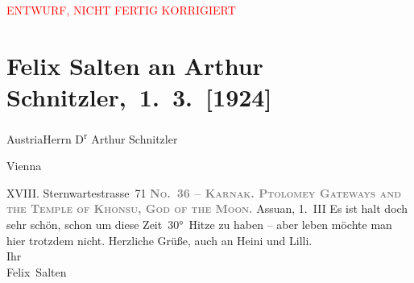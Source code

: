 
\begin{center}
            \textcolor{red}{ENTWURF, NICHT FERTIG KORRIGIERT}
                      \end{center}
            
         
         \renewcommand{\erwaehntePersonen}{Personen: Felix Salten, Heinrich Schnitzler, Lilly Schnitzler}
         \renewcommand{\erwaehnteOrte}{Orte: Assuan, Karnak Tempelanlage, Old Cataract Hotel, Sternwartestraße 71, Wien, Österreich}
         \renewcommand{\erwaehnteWerke}{}
               \section[ Felix Salten an Arthur Schnitzler, 1. 3. {[}1924{]}]{ Felix Salten an Arthur Schnitzler, 1. 3. {[}1924{]}}\nopagebreak{}\rehead{ }\begin{ledgroupsized}[t]{13cm}\normalsize\beginnumbering \toendnotes[C]{\smallbreak\pagebreak[2]} 
\pstart{}{\pb}Austria\pend{}\pstart{}Herrn D\textsuperscript{r} Arthur Schnitzler\pend{}\pstart{}\begin{otherlanguage}{english}Vienna\end{otherlanguage}\pend{}\pstart{}XVIII. Sternwartestrasse 71\pend{}{\bigskip}\pstart
           \noindent{}{\pb}\textcolor{gray}{\textbf{\textsc{No. 36 – Karnak. Ptolomey Gateways and the Temple of Khonsu, God
                           of the Moon}.}}\pend
           \pstart
           \raggedleft{}{\pb}Assuan, 1. III\pend
           \pstart
           Es ist halt doch sehr schön, schon um diese Zeit 30° Hitze zu haben – aber leben
               möchte man hier trotzdem nicht. Herzliche Grüße, auch an Heini und Lilli.
               {\\}Ihr {\\}\spacefill\mbox{Felix Salten}\pend
           
         
         \endnumbering{}\end{ledgroupsized}  \newcommand{\dateiname}{L03594}\newcommand{\titel}{Felix Salten an Arthur Schnitzler, 1. 3. [1924]}\newcommand{\editorInnen}{Martin Anton Müller und Laura Untner}
      